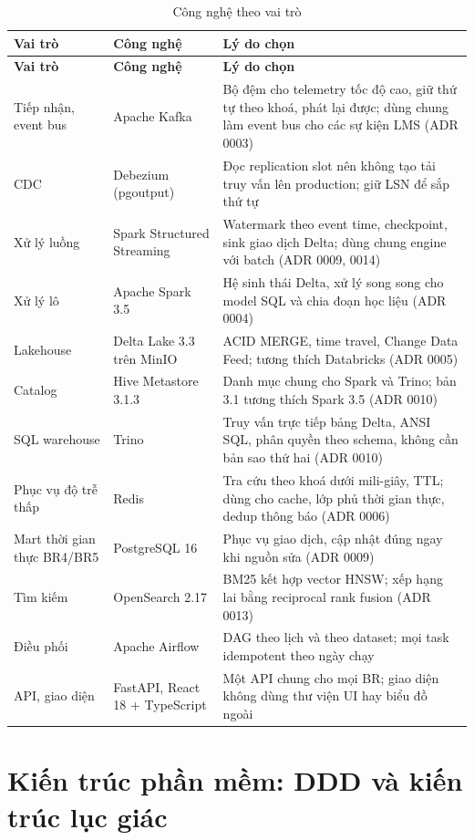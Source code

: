 {\small
\begin{longtable}{@{}L{3.2cm}L{3.4cm}L{7.9cm}@{}}
\caption{Công nghệ theo vai trò}\label{tab:tech}\\
\toprule
\textbf{Vai trò} & \textbf{Công nghệ} & \textbf{Lý do chọn} \\
\midrule
\endfirsthead
\toprule
\textbf{Vai trò} & \textbf{Công nghệ} & \textbf{Lý do chọn} \\
\midrule
\endhead
Tiếp nhận, event bus & Apache Kafka & Bộ đệm cho telemetry tốc độ cao, giữ thứ tự theo khoá, phát lại được; dùng chung làm event bus cho các sự kiện LMS (ADR 0003) \\
CDC & Debezium (pgoutput) & Đọc replication slot nên không tạo tải truy vấn lên production; giữ LSN để sắp thứ tự \\
Xử lý luồng & Spark Structured Streaming & Watermark theo event time, checkpoint, sink giao dịch Delta; dùng chung engine với batch (ADR 0009, 0014) \\
Xử lý lô & Apache Spark 3.5 & Hệ sinh thái Delta, xử lý song song cho model SQL và chia đoạn học liệu (ADR 0004) \\
Lakehouse & Delta Lake 3.3 trên MinIO & ACID MERGE, time travel, Change Data Feed; tương thích Databricks (ADR 0005) \\
Catalog & Hive Metastore 3.1.3 & Danh mục chung cho Spark và Trino; bản 3.1 tương thích Spark 3.5 (ADR 0010) \\
SQL warehouse & Trino & Truy vấn trực tiếp bảng Delta, ANSI SQL, phân quyền theo schema, không cần bản sao thứ hai (ADR 0010) \\
Phục vụ độ trễ thấp & Redis & Tra cứu theo khoá dưới mili-giây, TTL; dùng cho cache, lớp phủ thời gian thực, dedup thông báo (ADR 0006) \\
Mart thời gian thực BR4/BR5 & PostgreSQL 16 & Phục vụ giao dịch, cập nhật đúng ngay khi nguồn sửa (ADR 0009) \\
Tìm kiếm & OpenSearch 2.17 & BM25 kết hợp vector HNSW; xếp hạng lai bằng reciprocal rank fusion (ADR 0013) \\
Điều phối & Apache Airflow & DAG theo lịch và theo dataset; mọi task idempotent theo ngày chạy \\
API, giao diện & FastAPI, React 18 + TypeScript & Một API chung cho mọi BR; giao diện không dùng thư viện UI hay biểu đồ ngoài \\
\bottomrule
\end{longtable}}

\section{Kiến trúc phần mềm: DDD và kiến trúc lục giác}

